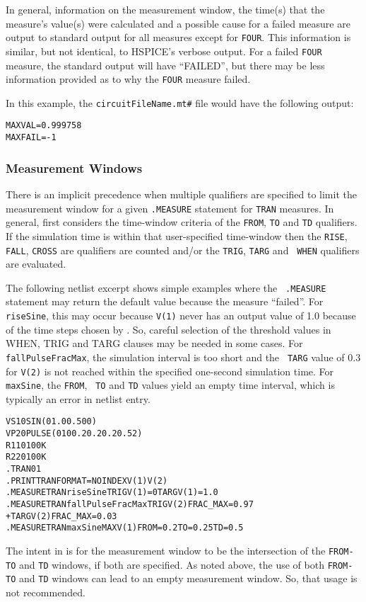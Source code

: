 In general, information on the measurement window, the time(s) that
the measure's value(s) were calculated and a possible cause for a
failed measure are output to standard output for all measures except
for {\tt FOUR}. This information is similar, but not identical, to
HSPICE's verbose output.  For a failed {\tt FOUR} measure, the
standard output will have ``FAILED'', but there may be less
information provided as to why the {\tt FOUR} measure failed.

In this example, the \texttt{circuitFileName.mt\#} file would have the following output:
\begin{alltt}
MAXVAL = 0.999758
MAXFAIL = -1
\end{alltt}

\subsubsection{Measurement Windows}
\label{Measure_Measurement_Windows}
There is an implicit precedence when multiple qualifiers are specified
to limit the measurement window for a given {\tt .MEASURE} statement
for {\tt TRAN} measures.  In general, \Xyce{} first considers the
time-window criteria of the {\tt FROM}, {\tt TO} and {\tt TD}
qualifiers.  If the simulation time is within that user-specified
time-window then the {\tt RISE}, {\tt FALL}, {\tt CROSS} are
qualifiers are counted and/or the {\tt TRIG}, {\tt TARG} and {\tt
WHEN} qualifiers are evaluated.

The following netlist excerpt shows simple examples where the {\tt
.MEASURE} statement may return the default value because the measure
``failed''.  For {\tt riseSine}, this may occur because {\tt V(1)}
never has an output value of 1.0 because of the time steps chosen
by \Xyce{}. So, careful selection of the threshold values in WHEN,
TRIG and TARG clauses may be needed in some cases.  For {\tt
fallPulseFracMax}, the simulation interval is too short and the {\tt
TARG} value of 0.3 for {\tt V(2)} is not reached within the specified
one-second simulation time.  For {\tt maxSine}, the {\tt FROM}, {\tt
TO} and {\tt TD} values yield an empty time interval, which is
typically an error in netlist entry.
\begin{alltt}
VS  1  0  SIN(0 1.0 0.5 0 0)
VP  2  0  PULSE( 0 10 0.2 0.2 0.2 0.5 2)
R1  1  0  100K
R2  2  0  100K
.TRAN 0  1
.PRINT TRAN FORMAT=NOINDEX V(1) V(2)
.MEASURE TRAN riseSine TRIG V(1)=0 TARG V(1)=1.0
.MEASURE TRAN fallPulseFracMax TRIG V(2) FRAC_MAX=0.97
+ TARG V(2) FRAC_MAX=0.03
.MEASURE TRAN maxSine MAX V(1) FROM=0.2 TO=0.25 TD=0.5
\end{alltt}
The intent in \Xyce{} is for the measurement window to be the
intersection of the {\tt FROM-TO} and {\tt TD} windows, if both are
specified.  As noted above, the use of both {\tt FROM-TO} and {\tt TD}
windows can lead to an empty measurement window.  So, that usage is
not recommended.

